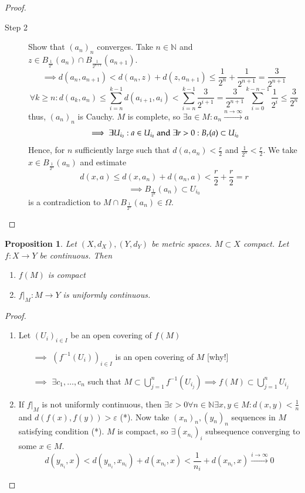 \documentclass[a4paper]{article}
\newcounter{lecref}[section]
\numberwithin{lecref}{section}
\newtheorem{proposition}[lecref]{Proposition}
\begin{document}
\begin{proof}
\begin{description}
\begin{description}
				\item[Step 2] Show that $(a_n)_n$ converges. Take $n \in \mathbb N$ and $z \in B_{\frac{1}{2^n}}(a_n) \cap B_{\frac{1}{2^{n+1}}}(a_{n+1})$.
					\[ \implies d(a_n, a_{n+1}) < d(a_n, z) + d(z, a_{n+1}) \leq \frac{1}{2^n} + \frac{1}{2^{n+1}} = \frac{3}{2^{n+1}} \]
					\[ \forall k \geq n: d(a_k, a_n) \leq \sum_{i=n}^{k-1} d(a_{i+1}, a_i) < \sum_{i=n}^{k-1} \frac{3}{2^{i+1}} = \frac{3}{2^{n+1}} \sum_{i=0}^{k-n-1} \frac{1}{2^i} \leq \frac{3}{2^n} \]
					thus, $(a_n)_n$ is Cauchy. $M$ is complete, so $\exists a \in M: a_n \xrightarrow{n \to \infty} a$
					\[ \implies \exists U_{i_0}: a \in U_{i_0}$ and $\exists r > 0: B_r(a) \subset U_{i_0} \]
					Hence, for $n$ sufficiently large such that $d(a, a_n) < \frac r2$ and $\frac1{2^n} < \frac r2$.
					We take $x \in B_{\frac1{2^n}}(a_n)$ and estimate
					\[ d(x, a) \leq d(x, a_n) + d(a_n, a) < \frac r2 + \frac r2 = r \]
					\[ \implies B_{\frac{1}{2^n}}(a_n) \subset U_{i_0} \]
					is a contradiction to $M \cap B_{\frac1{2^n}}(a_n) \in \Omega$.
			\end{description}
	\end{description}
\end{proof}

\begin{proposition}
	\label{proposition:1.20}
	Let $(X, d_X), (Y, d_Y)$ be metric spaces. $M \subset X$ compact. Let $f: X \to Y$ be continuous. Then
	\begin{enumerate}
		\item $f(M)$ is compact
		\item $f|_M: M \to Y$ is uniformly continuous.
	\end{enumerate}
\end{proposition}

\begin{proof}
	\begin{enumerate}
		\item Let $(U_i)_{i \in I}$ be an open covering of $f(M)$
			\begin{enumerate}
				\item[$\implies$] $(f^{-1}(U_i))_{i \in I}$ is an open covering of $M$ [why!]
				\item[$\implies$] $\exists c_1, \dots, c_n$ such that $M \subset \bigcup_{j=1}^n f^{-1}(U_{i_j}) \implies f(M) \subset \bigcup_{j=1}^n U_{i_j}$
			\end{enumerate}
		\item If $f|_M$ is not uniformly continuous, then $\exists \varepsilon > 0 \forall n \in \mathbb N \exists x, y \in M: d(x, y) < \frac1n$ and $d(f(x), f(y)) > \varepsilon$ (*).
			Now take $(x_n)_n, (y_n)_n$ sequences in $M$ satisfying condition (*).
			$M$ is compact, so $\exists (x_{n_i})_{i}$ subsequence converging to some $x \in M$.
			\[ d(y_{n_i}, x) < d(y_{n_i}, x_{n_i}) + d(x_{n_i}, x) < \frac{1}{n_i} + d(x_{n_i}, x) \xrightarrow{i \to \infty} 0 \]
	\end{enumerate}
\end{proof}
\end{document}
